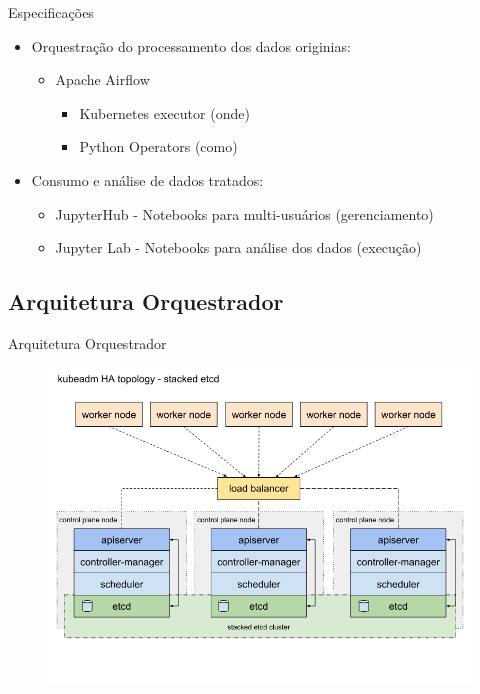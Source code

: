 \documentclass[10pt,brazil]{beamer}
\theoremstyle{definition}
\begin{document}
\begin{frame}[allowframebreaks]{Especificações}
      \begin{itemize}
        \item Orquestração do processamento dos dados originias:
              \begin{itemize}
                \item Apache Airflow\textregistered\
                \begin{itemize}
                  \item Kubernetes executor (onde)
                  \item Python Operators (como)
                \end{itemize}
              \end{itemize}
        \item Consumo e análise de dados tratados:
              \begin{itemize}
                \item JupyterHub - Notebooks para multi-usuários (gerenciamento)
                \item Jupyter Lab - Notebooks para análise dos dados (execução)
              \end{itemize}
      \end{itemize}
  
  
\end{frame}


\subsection{Arquitetura Orquestrador}

\begin{frame}{Arquitetura Orquestrador}
\begin{figure}
    \centering
    \includegraphics[width=1\textwidth]{kubeadm-ha-topology-stacked-etcd.png}
    \label{fig:k8s-arch}
\end{figure}
\end{frame}
\end{document}
